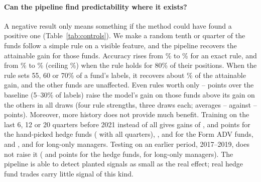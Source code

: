 \paragraph{Can the pipeline find predictability where it exists?} A negative
result only means something if the method could have found a positive one
(Table~\ref{tab:controls}). We make a random tenth or quarter of the funds
follow a simple rule on a visible feature, and the pipeline recovers the
attainable gain for those funds. Accuracy rises from \injbaseten\% to
\injmodelten\% for an exact rule, and from \injbasenoisy\% to
\injmodelnoisy\% (ceiling \injrulenoisy\%) when the rule holds for 80\% of
their positions. When the rule sets 55, 60 or 70\% of a fund's labels, it
recovers about \grrecsixty\% of the attainable gain, and the other funds are
unaffected.
Even rules worth only \weakattlo--\weakatthi{} points over the baseline
(5--30\% of labels) raise the model's gain on those funds above its gain on
the others in all \weakdraws{} draws (four rule strengths, three draws each;
averages \weakgainlo--\weakgainhi{} against \weakotherlo--\weakotherhi{} points).
Moreover, more history does not provide much benefit. Training on the last 6, 12 or 20
quarters before 2021 instead of all \lcallquarters{} gives gains of
\lcsixM{}, \lctwelveM{} and \lctwentyM{} points for the hand-picked hedge
funds (\lcallM{} with all quarters), \lcsixA{}, \lctwelveA{} and \lctwentyA{}
for the Form ADV funds, and \lcsixL{}, \lctwelveL{} and \lctwentyL{} for
long-only managers. Testing on an earlier period, 2017--2019, does not
raise it (\earlyM{} and \earlyA{} points for the hedge funds, \earlyL{} for
long-only managers). The pipeline is able to detect planted signals as small as the
real effect; real hedge fund trades carry little signal of this kind.



